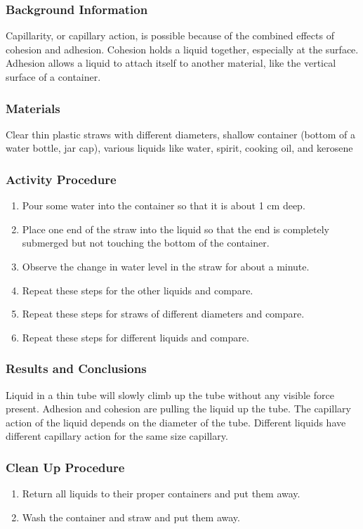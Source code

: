 \subsubsection*{Background Information}
Capillarity, or capillary action, is possible because of the combined effects of cohesion and adhesion. Cohesion holds a liquid together, especially at the surface. Adhesion allows a liquid to attach itself to another material, like the vertical surface of a container. 

\subsubsection*{Materials}
Clear thin plastic straws with different diameters, shallow container (bottom of a water bottle, jar cap), various liquids like water, spirit, cooking oil, and kerosene 

\subsubsection*{Activity Procedure}
\begin{enumerate}
\item{Pour some water into the container so that it is about 1 cm deep.} 
\item{Place one end of the straw into the liquid so that the end is completely submerged but not touching the bottom of the container.} 
\item{Observe the change in water level in the straw for about a minute.} 
\item{Repeat these steps for the other liquids and compare.}
\item{Repeat these steps for straws of different diameters and compare.} 
\item{Repeat these steps for different liquids and compare.} 
\end{enumerate}

\subsubsection*{Results and Conclusions}
Liquid in a thin tube will slowly climb up the tube without any visible force present. Adhesion and cohesion are pulling the liquid up the tube. The capillary action of the liquid depends on the diameter of the tube. Different liquids have different capillary action for the same size capillary.

\subsubsection*{Clean Up Procedure}
\begin{enumerate}
\item{Return all liquids to their proper containers and put them away.} 
\item{Wash the container and straw and put them away.} 
\end{enumerate}

